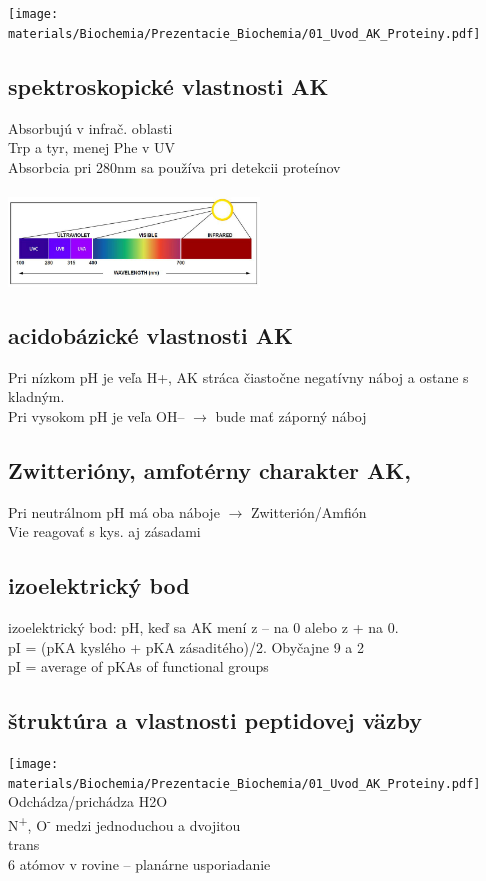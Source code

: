 \texttt{[image: materials/Biochemia/Prezentacie\_Biochemia/01\_Uvod\_AK\_Proteiny.pdf]}
\\
\subsection{spektroskopické vlastnosti AK}
Absorbujú v infrač. oblasti\\
Trp a tyr, menej Phe v UV\\
Absorbcia pri 280nm sa používa pri detekcii proteínov\\
\\
\includegraphics[width=0.5\textwidth]{images/wavelength}
\\
\subsection{acidobázické vlastnosti AK}
Pri nízkom pH je veľa H+, AK stráca čiastočne negatívny náboj a ostane s kladným. \\
Pri vysokom pH je veľa OH-- $\rightarrow$ bude mať záporný náboj\\
\subsection{Zwitterióny, amfotérny charakter AK, }
Pri neutrálnom pH má oba náboje $\rightarrow$ Zwitterión/Amfión\\
Vie reagovať s kys. aj zásadami\\
\subsection{izoelektrický bod}
izoelektrický bod: pH, keď sa AK mení z -- na 0 alebo z + na 0.\\
\tab pI = (pKA kyslého + pKA zásaditého)/2. Obyčajne 9 a 2\\
\tab pI = average of pKAs of functional groups
\subsection{štruktúra a vlastnosti peptidovej väzby}

\texttt{[image: materials/Biochemia/Prezentacie\_Biochemia/01\_Uvod\_AK\_Proteiny.pdf]}
\\
Odchádza/prichádza H2O\\
N\textsuperscript{+}, O\textsuperscript{-}
medzi jednoduchou a dvojitou\\
trans\\
6 atómov v rovine -- planárne usporiadanie
